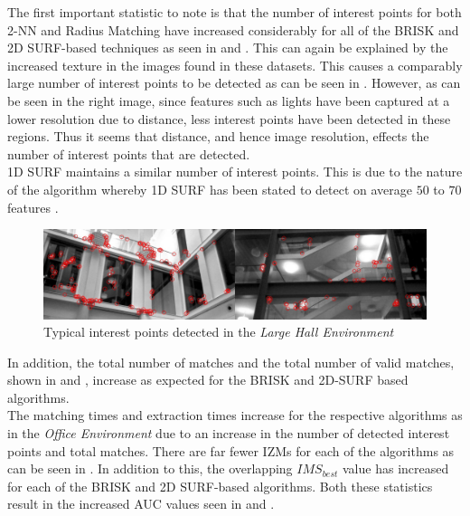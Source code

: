 \documentclass[11pt]{report}
\begin{document}
The first important statistic to note is that the number of interest points for both 2-NN and Radius Matching have increased considerably for all of the BRISK and 2D SURF-based techniques as seen in  and . This can again be explained by the increased texture in the images found in these datasets. This causes a comparably large number of interest points to be detected as can be seen in . However, as can be seen in the right image, since features such as lights have been captured at a lower resolution due to distance, less interest points have been detected in these regions. Thus it seems that distance, and hence image resolution, effects the number of interest points that are detected.\\

1D SURF maintains a similar number of interest points. This is due to the nature of the algorithm whereby 1D SURF has been stated to detect on average $50$ to $70$ features \cite{Anderson}.\\


\begin{figure}
  \centering
    \includegraphics[width=1.0\textwidth]{../Drawings/Matching/dataset3_interestPoints.jpg}
    \caption{Typical interest points detected in the \textit{Large Hall Environment}} 
    \label{fig:lh_ip}
\end{figure}


In addition, the total number of matches and the total number of valid matches, shown in  and , increase as expected for the BRISK and 2D-SURF based algorithms.\\

The matching times and extraction times increase for the respective algorithms as in the \textit{Office Environment} due to an increase in the number of detected interest points and total matches. There are far fewer IZMs for each of the algorithms as can be seen in . In addition to this, the overlapping $IMS_{best}$ value has increased for each of the BRISK and 2D SURF-based algorithms. Both these statistics result in the increased AUC values seen in  and . \\
\end{document}

